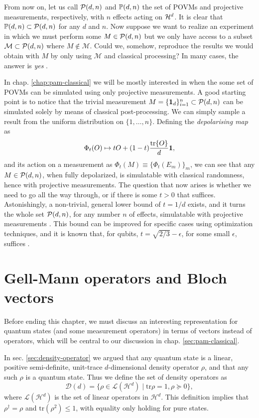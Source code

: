 		From now on, let us call $\mathcal{P}(d,n)$ and $\mathbb{P}(d,n)$ the set of POVMs and projective measurements, respectively, with $n$ effects acting on $\mathcal{H}^{d}$. It is clear that $\mathbb{P}(d,n) \subset \mathcal{P}(d,n)$ for any $d$ and $n$. Now suppose we want to realize an experiment in which we must perform some $M \in \mathcal{P}(d,n)$ but we only have access to a subset $\mathcal{M} \subset \mathcal{P}(d,n)$ where $M \notin \mathcal{M}$. Could we, somehow, reproduce the results we would obtain with $M$ by only using $\mathcal{M}$ and classical processing? In many cases, the answer is \emph{yes} \cite{guerini_tese,guerini_2017_measurementsimulability,haapasalo_2012_measurementsmixing}.
		
		In chap. \ref{chap:pam-classical} we will be mostly interested in when the some set of POVMs can be simulated using only projective measurements. A good starting point is to notice that the trivial measurement $M = \{ \mathbf{1}_d \}_{i=1}^n \subset \mathcal{P}(d,n)$ can be simulated solely by means of classical post-processing. We can simply sample a result from the uniform distribution on $\{ 1, \ldots, n \}$. Defining the \emph{depolarising map} as 
		$$
			\Phi_t(O) \mapsto t O + (1-t) \frac{ \tr{O} }{d} \mathbf{1} ,
		$$
		and its action on a measurement as $\Phi_t (M) \equiv \{ \Phi_t(E_m) \}_m$, we can see that any $M \in \mathcal{P}(d,n)$, when fully depolarized, is simulatable with classical randomness, hence with projective measurements. The question that now arises is whether we need to go all the way through, or if there is some $t > 0$ that suffices. Astonishingly, a non-trivial, general lower bound of $t = 1/d$ exists, and it turns the whole set $\mathcal{P}(d,n)$, for any number $n$ of effects, simulatable with projective measurements \cite{oszmaniec_2017_simulating}. This bound can be improved for specific cases using optimization techniques, and it is known that, for qubits, $t = \sqrt{2/3} - \epsilon$, for some small $\epsilon$, suffices \cite{guerini_tese}.
		

	\section{Gell-Mann operators and Bloch vectors}

		Before ending this chapter, we must discuss an interesting representation for quantum states (and some measurement operators) in terms of vectors instead of operators, which will be central to our discussion in chap. \ref{sec:pam-classical}.

		In sec. \ref{sec:density-operator} we argued that any quantum state is a linear, positive semi-definite, unit-trace $d$-dimensional density operator $\rho$, and that any such $\rho$ is a quantum state. Thus we define the set of density operators as
		$$
			\mathcal{D}(d) = \{ \rho \in \mathcal{L}(\mathcal{H}^d) \mid \text{tr}\rho=1, \rho \succeq0 \} ,
		$$
		where $\mathcal{L}(\mathcal{H}^d)$ is the set of linear operators in $\mathcal{H}^d$. This definition implies that $\rho^\dagger = \rho$ and $\text{tr}(\rho^2) \leq 1$, with equality only holding for pure states.

